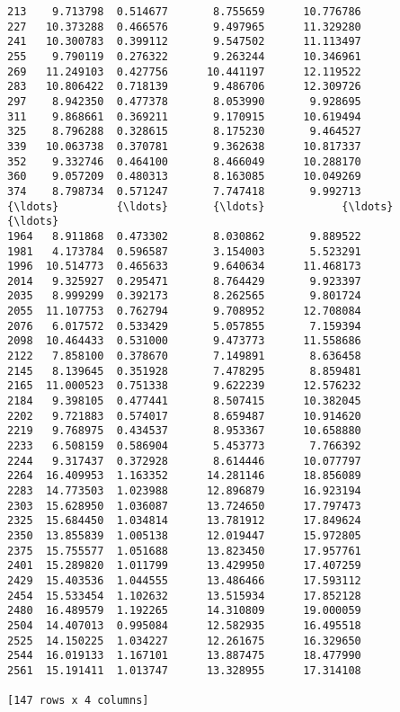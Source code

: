 \documentclass[11pt]{article}
\begin{document}
\begin{Verbatim}[commandchars=\\\{\}]
213    9.713798  0.514677       8.755659      10.776786
227   10.373288  0.466576       9.497965      11.329280
241   10.300783  0.399112       9.547502      11.113497
255    9.790119  0.276322       9.263244      10.346961
269   11.249103  0.427756      10.441197      12.119522
283   10.806422  0.718139       9.486706      12.309726
297    8.942350  0.477378       8.053990       9.928695
311    9.868661  0.369211       9.170915      10.619494
325    8.796288  0.328615       8.175230       9.464527
339   10.063738  0.370781       9.362638      10.817337
352    9.332746  0.464100       8.466049      10.288170
360    9.057209  0.480313       8.163085      10.049269
374    8.798734  0.571247       7.747418       9.992713
{\ldots}         {\ldots}       {\ldots}            {\ldots}            {\ldots}
1964   8.911868  0.473302       8.030862       9.889522
1981   4.173784  0.596587       3.154003       5.523291
1996  10.514773  0.465633       9.640634      11.468173
2014   9.325927  0.295471       8.764429       9.923397
2035   8.999299  0.392173       8.262565       9.801724
2055  11.107753  0.762794       9.708952      12.708084
2076   6.017572  0.533429       5.057855       7.159394
2098  10.464433  0.531000       9.473773      11.558686
2122   7.858100  0.378670       7.149891       8.636458
2145   8.139645  0.351928       7.478295       8.859481
2165  11.000523  0.751338       9.622239      12.576232
2184   9.398105  0.477441       8.507415      10.382045
2202   9.721883  0.574017       8.659487      10.914620
2219   9.768975  0.434537       8.953367      10.658880
2233   6.508159  0.586904       5.453773       7.766392
2244   9.317437  0.372928       8.614446      10.077797
2264  16.409953  1.163352      14.281146      18.856089
2283  14.773503  1.023988      12.896879      16.923194
2303  15.628950  1.036087      13.724650      17.797473
2325  15.684450  1.034814      13.781912      17.849624
2350  13.855839  1.005138      12.019447      15.972805
2375  15.755577  1.051688      13.823450      17.957761
2401  15.289820  1.011799      13.429950      17.407259
2429  15.403536  1.044555      13.486466      17.593112
2454  15.533454  1.102632      13.515934      17.852128
2480  16.489579  1.192265      14.310809      19.000059
2504  14.407013  0.995084      12.582935      16.495518
2525  14.150225  1.034227      12.261675      16.329650
2544  16.019133  1.167101      13.887475      18.477990
2561  15.191411  1.013747      13.328955      17.314108

[147 rows x 4 columns]

    \end{Verbatim}
\end{document}

